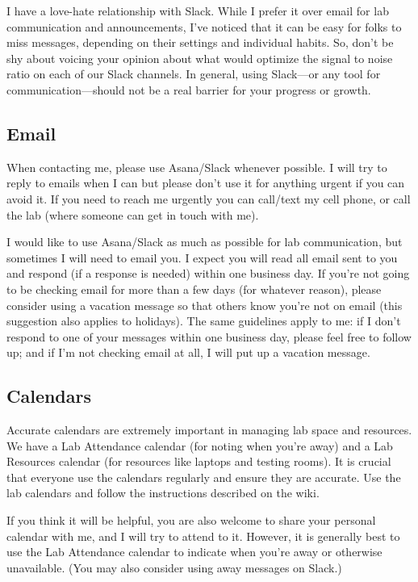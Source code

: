 \documentclass[letterpaper,11pt,oneside]{memoir}
\begin{document}
\begin{shaded}
\noindent I have a love-hate relationship with Slack. While I prefer it over email for lab communication and announcements, I've noticed that it can be easy for folks to miss messages, depending on their settings and individual habits. So, don't be shy about voicing your opinion about what would optimize the signal to noise ratio on each of our Slack channels. In general, using Slack---or any tool for communication---should not be a real barrier for your progress or growth.
\end{shaded}

\subsection{Email}
When contacting me, please use Asana/Slack whenever possible. I will try to reply to emails when I can but please don't use it for anything urgent if you can avoid it. If you need to reach me urgently you can call/text my cell phone, or call the lab (where someone can get in touch with me). 

I would like to use Asana/Slack as much as possible for lab communication, but sometimes I will need to email you. I expect you will read all email sent to you and respond (if a response is needed) within one business day. If you're not going to be checking email for more than a few days (for whatever reason), please consider using a vacation message so that others know you're not on email (this suggestion also applies to holidays). The same guidelines apply to me: if I don't respond to one of your messages within one business day, please feel free to follow up; and if I'm not checking email at all, I will put up a vacation message. 


\subsection{Calendars}
Accurate calendars are extremely important in managing lab space and resources. We have a Lab Attendance calendar (for noting when you're away) and a Lab Resources calendar (for resources like laptops and testing rooms). It is crucial that everyone use the calendars regularly and ensure they are accurate. Use the lab calendars and follow the instructions described on the wiki.

If you think it will be helpful, you are also welcome to share your personal calendar with me, and I will try to attend to it. However, it is generally best to use the Lab Attendance calendar to indicate when you're away or otherwise unavailable. (You may also consider using away messages on Slack.)
\end{document}
